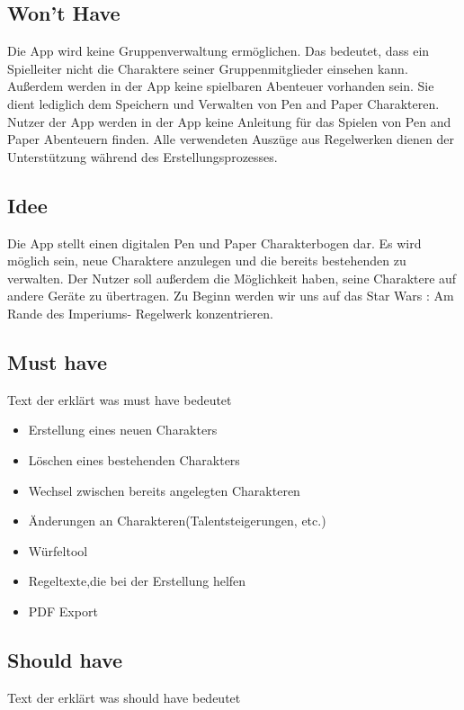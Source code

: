 \subsection{Won't Have}
Die App wird keine Gruppenverwaltung ermöglichen. Das bedeutet, dass ein Spielleiter nicht die Charaktere seiner Gruppenmitglieder einsehen kann. Außerdem werden in der App keine spielbaren Abenteuer vorhanden sein. Sie dient lediglich dem Speichern und Verwalten von Pen and Paper Charakteren. Nutzer der App werden in der App keine Anleitung für das Spielen von Pen and Paper Abenteuern finden. Alle verwendeten Auszüge aus Regelwerken dienen der Unterstützung während des Erstellungsprozesses. 

\subsection{Idee}

Die App stellt einen digitalen Pen und Paper Charakterbogen dar. Es wird möglich sein, neue Charaktere anzulegen und die bereits bestehenden zu verwalten. Der Nutzer soll außerdem die Möglichkeit haben, seine Charaktere auf andere Geräte zu übertragen. Zu Beginn werden wir uns auf das \glqq Star Wars : Am Rande des Imperiums\grqq- Regelwerk konzentrieren.
\subsection{Must have}

Text der erklärt was must have bedeutet

\begin{itemize}
	\item Erstellung eines neuen Charakters
	\item Löschen eines bestehenden Charakters
	\item Wechsel zwischen bereits angelegten Charakteren
	\item Änderungen an Charakteren(Talentsteigerungen, etc.)
	\item Würfeltool
	\item Regeltexte,die bei der Erstellung helfen
	\item PDF Export
\end{itemize}

\subsection{Should have}

Text der erklärt was should have bedeutet

